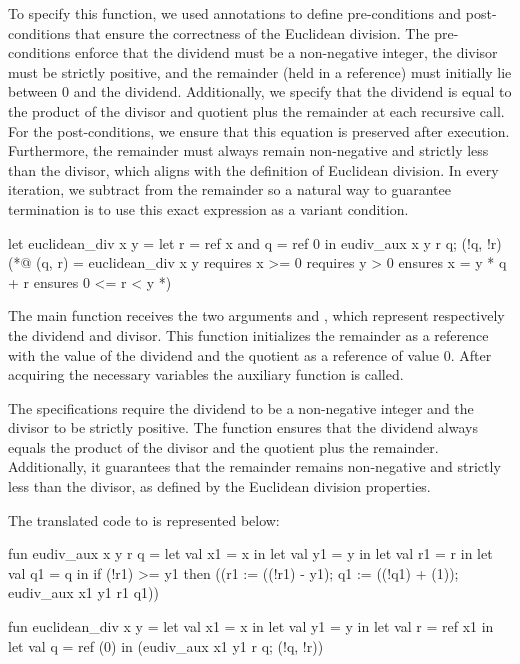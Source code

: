 To specify this function, we used \gospel annotations to define pre-conditions and post-conditions that ensure the correctness of 
the Euclidean division. The pre-conditions enforce that the dividend must be a non-negative integer, the divisor must be strictly 
positive, and the remainder (held in a reference) must initially lie between 0 and the dividend. Additionally, we specify that the 
dividend is equal to the product of the divisor and quotient plus the remainder at each recursive call. For the post-conditions, we 
ensure that this equation is preserved after execution. Furthermore, the remainder must always remain non-negative and strictly less 
than the divisor, which aligns with the definition of Euclidean division. In every iteration, we subtract  from the
remainder  so a natural way to guarantee termination is to use this exact expression as a variant condition.

\begin{gospell}
let euclidean_div x y =
    let r = ref x and q = ref 0 in 
  eudiv_aux x y r q;
  (!q, !r)
(*@ (q, r) = euclidean_div x y
    requires x >= 0
    requires y > 0
    ensures x = y * q + r
    ensures 0 <= r < y *)
\end{gospell}

The main function  receives the two arguments  and , which represent respectively
the dividend and divisor. This function initializes the remainder  as a reference with the value of the dividend 
 and the quotient  as a reference of value 0. After acquiring the necessary variables the auxiliary function 
is called.

The \gospel specifications require the dividend to be a non-negative integer and the divisor to be strictly positive. The function 
ensures that the dividend always equals the product of the divisor and the quotient plus the remainder. Additionally, it guarantees 
that the remainder remains non-negative and strictly less than the divisor, as defined by the Euclidean division properties.

The translated code to \cml is represented below:

\begin{cakeml}
fun eudiv_aux x y r q = let val x1 = x in
  let val y1 = y in
  let val r1 = r in
  let val q1 = q in
  if (!r1) >= y1
  then ((r1 := ((!r1) - y1); q1 := ((!q1) + (1)); eudiv_aux x1 y1 r1 q1))

fun euclidean_div x y =
  let val x1 = x in
  let val y1 = y in
  let val r = ref x1 in
  let val q = ref (0) in (eudiv_aux x1 y1 r q; (!q, !r))
\end{cakeml}

